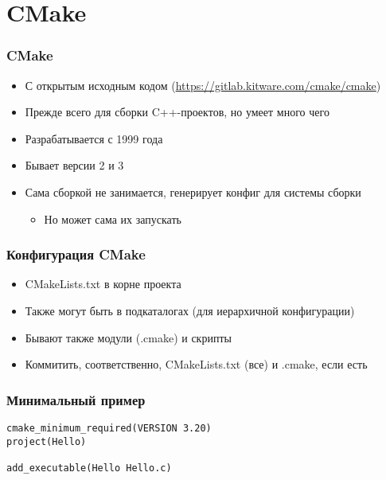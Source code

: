 \documentclass{../../slides-style}
\begin{document}
    \section{CMake}

    \begin{frame}
        \frametitle{CMake}
        \begin{itemize}
            \item С открытым исходным кодом (\url{https://gitlab.kitware.com/cmake/cmake})
            \item Прежде всего для сборки C++-проектов, но умеет много чего
            \item Разрабатывается с 1999 года
            \item Бывает версии 2 и 3
            \item Сама сборкой не занимается, генерирует конфиг для системы сборки
            \begin{itemize}
                \item Но может сама их запускать
            \end{itemize}
        \end{itemize}
    \end{frame}

    \begin{frame}
        \frametitle{Конфигурация CMake}
        \begin{itemize}
            \item CMakeLists.txt в корне проекта
            \item Также могут быть в подкаталогах (для иерархичной конфигурации)
            \item Бывают также модули (.cmake) и скрипты
            \item Коммитить, соответственно, CMakeLists.txt (все) и .cmake, если есть
        \end{itemize}
    \end{frame}

    \begin{frame}[fragile]
        \frametitle{Минимальный пример}
        \begin{verbatim}
cmake_minimum_required(VERSION 3.20)
project(Hello)

add_executable(Hello Hello.c)
        \end{verbatim}
    \end{frame}
\end{document}
